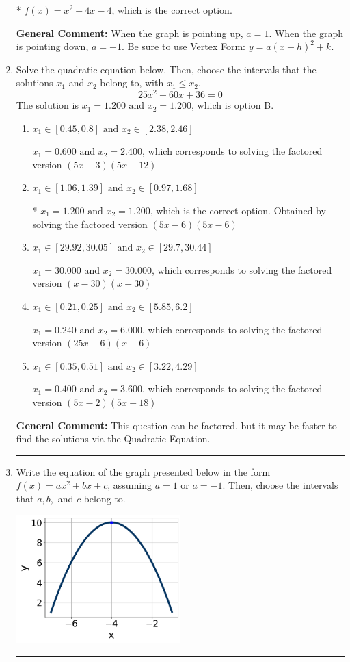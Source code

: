 \documentclass{extbook}[14pt]
\newcommand{\litem}[1]{\item #1

\rule{\textwidth}{0.4pt}}
\begin{document}
\begin{enumerate}
{\begin{enumerate}[label=\Alph*.]
* $f(x)=x^{2} -4 x -4$, which is the correct option.
\end{enumerate}

\textbf{General Comment:} When the graph is pointing up, $a=1$. When the graph is pointing down, $a=-1$. Be sure to use Vertex Form: $y = a(x-h)^2+k$.
}
\litem{
Solve the quadratic equation below. Then, choose the intervals that the solutions $x_1$ and $x_2$ belong to, with $x_1 \leq x_2$.
\[ 25x^{2} -60 x + 36 = 0 \]
The solution is \( x_1 = 1.200 \text{ and } x_2 = 1.200 \), which is option B.\begin{enumerate}[label=\Alph*.]
\item \( x_1 \in [0.45, 0.8] \text{ and } x_2 \in [2.38, 2.46] \)

$x_1 = 0.600 \text{ and } x_2 = 2.400$, which corresponds to solving the factored version $(5x -3)(5x -12)$
\item \( x_1 \in [1.06, 1.39] \text{ and } x_2 \in [0.97, 1.68] \)

* $x_1 = 1.200 \text{ and } x_2 = 1.200$, which is the correct option. Obtained by solving the factored version $(5x -6)(5x -6)$
\item \( x_1 \in [29.92, 30.05] \text{ and } x_2 \in [29.7, 30.44] \)

$x_1 = 30.000 \text{ and } x_2 = 30.000$, which corresponds to solving the factored version $(x -30)(x -30)$
\item \( x_1 \in [0.21, 0.25] \text{ and } x_2 \in [5.85, 6.2] \)

$x_1 = 0.240 \text{ and } x_2 = 6.000$, which corresponds to solving the factored version $(25x -6)(x -6)$
\item \( x_1 \in [0.35, 0.51] \text{ and } x_2 \in [3.22, 4.29] \)

$x_1 = 0.400 \text{ and } x_2 = 3.600$, which corresponds to solving the factored version $(5x -2)(5x -18)$
\end{enumerate}

\textbf{General Comment:} This question can be factored, but it may be faster to find the solutions via the Quadratic Equation.
}
\litem{
Write the equation of the graph presented below in the form $f(x)=ax^2+bx+c$, assuming  $a=1$ or $a=-1$. Then, choose the intervals that $a, b,$ and $c$ belong to.

\begin{center}
    \includegraphics[width=0.5\textwidth]{../Figures/quadraticGraphToEquationCopyA.png}
\end{center}



}
\end{enumerate}
\end{document}

